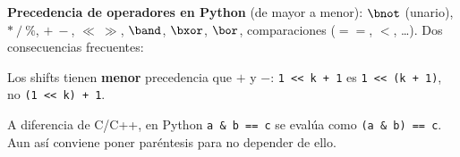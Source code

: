 \textbf{Precedencia de operadores en Python} (de mayor a menor): \(\bnot\) (unario), \(*\ /\ \%\), \(+\ -\), \(\ll\ \gg\), \(\band\), \(\bxor\), \(\bor\), comparaciones (\(==\), \(<\), \dots). Dos consecuencias frecuentes:
\begin{props}
  \item Los shifts tienen \textbf{menor} precedencia que \(+\) y \(-\): \texttt{1 <{}< k + 1} es \texttt{1 <{}< (k + 1)}, no \texttt{(1 <{}< k) + 1}.
  \item A diferencia de C/C++, en Python \texttt{a \& b == c} se evalúa como \texttt{(a \& b) == c}. Aun así conviene poner paréntesis para no depender de ello.
\end{props}
